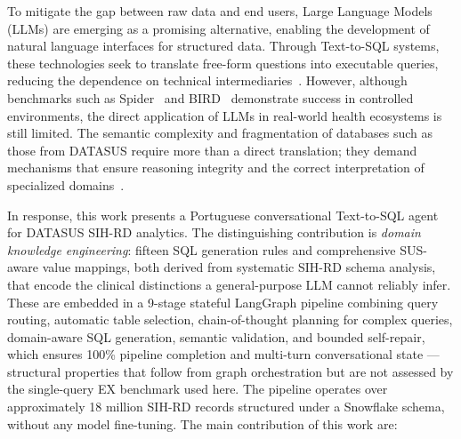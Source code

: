 \documentclass[conference]{IEEEtran}
\begin{document}
To mitigate the gap between raw data and end users, Large Language Models (LLMs) are emerging as a promising alternative, enabling the development of natural language interfaces for structured data. Through Text-to-SQL systems, these technologies seek to translate free-form questions into executable queries, reducing the dependence on technical intermediaries~\cite{hong2024survey}. However, although benchmarks such as Spider~\cite{yu2018spider} and BIRD~\cite{li2023bird} demonstrate success in controlled environments, the direct application of LLMs in real-world health ecosystems is still limited. The semantic complexity and fragmentation of databases such as those from DATASUS require more than a direct translation; they demand mechanisms that ensure reasoning integrity and the correct interpretation of specialized domains~\cite{Alhejaily2025}.

In response, this work presents a Portuguese conversational Text-to-SQL agent for DATASUS SIH-RD analytics. The distinguishing contribution is \emph{domain knowledge engineering}: fifteen SQL generation rules and comprehensive SUS-aware value mappings, both derived from systematic SIH-RD schema analysis, that encode the clinical distinctions a general-purpose LLM cannot reliably infer. These are embedded in a 9-stage stateful LangGraph pipeline combining query routing, automatic table selection, chain-of-thought planning for complex queries, domain-aware SQL generation, semantic validation, and bounded self-repair, which ensures 100\% pipeline completion and multi-turn conversational state --- structural properties that follow from graph orchestration but are not assessed by the single-query EX benchmark used here. The pipeline operates over approximately 18 million SIH-RD records structured under a Snowflake schema, without any model fine-tuning. The main contribution of this work are:
\end{document}
